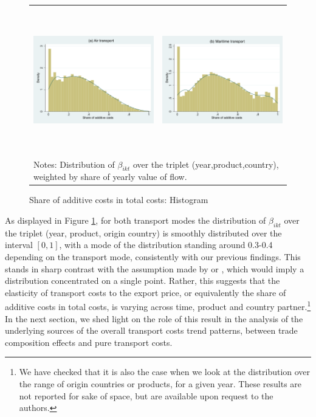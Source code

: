 \documentclass[a4paper,11pt]{article}
\begin{document}
\begin{figure}[htbp]
\caption{Share of additive costs in total costs: Histogram}
\label{fig:histogram_beta}
\begin{center}
\begin{tabular}{cc}
\includegraphics[width=3.0in, height=2.5in]{Etude_beta_pondere_air.pdf}
& \includegraphics[width=3.0in,height=2.5in]{Etude_beta_pondere_ves.pdf} \\
\multicolumn{2}{l}{{\footnotesize Notes: Distribution of $\beta_{ikt}$ over the triplet (year,product,country), weighted by share of yearly value of flow.}}\\
\end{tabular}
\end{center}
\end{figure}

As displayed in Figure \ref{fig:histogram_beta}, for both transport modes the distribution of $\beta_{ikt}$ over the triplet (year, product, origin country) is smoothly distributed over the interval $[0,1]$, with a mode of the distribution standing around 0.3-0.4 depending on the transport mode, consistently with our previous findings.
This stands in sharp contrast with the assumption made by  \cite{hummels_skiba} or \cite{hummels2007}, which would imply a distribution concentrated on a single point.
Rather, this suggests that the elasticity of transport costs to the export price, or equivalently the share of additive costs in total costs, is varying across time, product and country partner.\footnote{We have checked that it is also the case when we look at the distribution over the range of origin countries or products, for a given year.
These results are not reported for sake of space, but are available upon request to the authors.} In the next section, we shed light on the role of this result in the analysis of the underlying sources of the overall transport costs trend patterns, between trade composition effects and pure transport costs.
\end{document}
